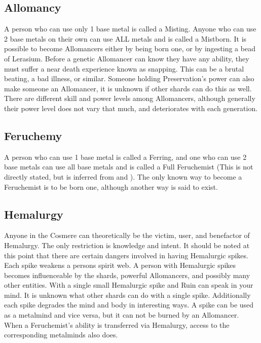 \documentclass[conference]{IEEEtran}
\begin{document}
\subsection*{\textbf{Allomancy}}
A person who can use only 1 base metal is called a Misting.\cite{TFE-CH3}  Anyone who can use 2 base metals on their own can use ALL metals and is called a Mistborn.  It is possible to become Allomancers either by being born one,\cite{TFE-CH3} or by ingesting a bead of Lerasium.\cite{WoA-CH59}  Before a genetic Allomancer can know they have any ability, they must suffer a near death experience known as snapping.\cite{TFE-CH17}  This can be a brutal beating, a bad illness, or similar.  Someone holding Preservation's power can also make someone an Allomancer,\cite{HoA-EP} it is unknown if other shards can do this as well.  There are different skill and power levels among Allomancers,\cite{WoA-CH54}\cite{WoF}\cite{TFE-CH38}\cite{TFE-CH31} although generally their power level does not vary that much, and deteriorates with each generation.\cite{AoL}\cite{WoF}  
\subsection*{\textbf{Feruchemy}}
A person who can use 1 base metal is called a Ferring,\cite{Ferring-name} and one who can use 2 base metals can use all base metals and is called a Full Feruchemist (This is not directly stated, but is inferred from\cite{AoL-CH1} and \cite{TFE-CH3}).  The only known way to become a Feruchemist is to be born one,\cite{TFE-CH22} although another way is said to exist.\cite{other-FE}

\subsection*{\textbf{Hemalurgy}}
Anyone in the Cosmere can theoretically be the victim, user, and benefactor of Hemalurgy.\cite{HE-hopper}   The only restriction is knowledge and intent.
It should be noted at this point that there are certain dangers involved in having Hemalurgic spikes.  Each spike weakens a persons spirit web.  A person with Hemalurgic spikes becomes influenceable  by the shards, powerful Allomancers, and possibly many other entities.\cite{HE-Shard}\cite{HoA-CH58}\cite{HoA-CH13}\cite{HoA-CH77}
With a single small Hemalurgic spike and Ruin can speak in your mind.\cite{HoA-CH65}  It is unknown what other shards can do with a single spike.
Additionally each spike degrades the mind and body in interesting ways.\cite{WoF}  
A spike can be used as a metalmind and vice versa,\cite{HE-Fe-Mind} but it can not be burned by an Allomancer.\cite{HE-Al-burn}
When a Feruchemist's ability is transferred via Hemalurgy, access to the corresponding metalminds also does.\cite{HE-Fe-access}
\end{document}
